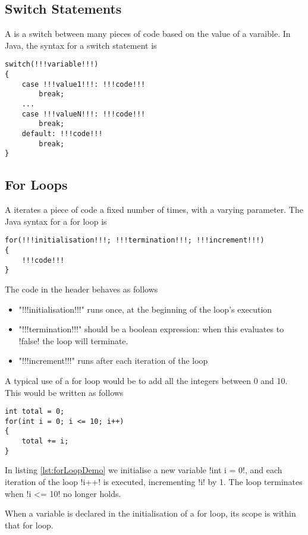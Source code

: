 \documentclass[11pt]{report}
\begin{document}
\subsection{Switch Statements}
A  is a switch between many pieces of code based on the value of a varaible. In Java, the syntax for a switch statement is
\vspace{-20pt}
\begin{lstlisting}[style=javaSyntax]
switch(!!!variable!!!)
{
    case !!!value1!!!: !!!code!!!
        break;
    ...
    case !!!valueN!!!: !!!code!!!
        break;
    default: !!!code!!!
        break;
}
\end{lstlisting}
\subsection{For Loops} \label{sec:forLoops}
A  iterates a piece of code a fixed number of times, with a varying parameter. The Java syntax for a for loop is
\vspace{-20pt}
\begin{lstlisting}[style=javaSyntax]
for(!!!initialisation!!!; !!!termination!!!; !!!increment!!!)
{
    !!!code!!!
}
\end{lstlisting}
The code in the header behaves as follows
\begin{itemize}
    \item \inlineJava"!!!initialisation!!!" runs once, at the beginning of the loop's execution
    \item \inlineJava"!!!termination!!!" should be a boolean expression: when this evaluates to \inlineJava!false! the loop will terminate.
    \item \inlineJava"!!!increment!!!" runs after each iteration of the loop
\end{itemize}
\begin{eg} A typical use of a for loop would be to add all the integers between 0 and 10. This would be written as follows
\begin{lstlisting}[caption=A typical use of a for loop, label=lst:forLoopDemo]
int total = 0;
for(int i = 0; i <= 10; i++)
{
    total += i;
}
\end{lstlisting}
In listing \ref{lst:forLoopDemo} we initialise a new variable \inlineJava!int i = 0!, and each iteration of the loop \inlineJava!i++! is executed, incrementing \inlineJava!i! by 1. The loop terminates when \inlineJava!i <= 10! no longer holds.
\end{eg}
\begin{note}
    When a variable is declared in the initialisation of a for loop, its scope is within that for loop.
\end{note}
\end{document}
